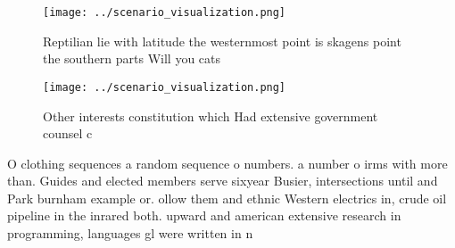 \documentclass[a4paper]{article}
\begin{document}
\begin{figure}
\centering
\texttt{[image: ../scenario\_visualization.png]}
\caption{Reptilian lie with latitude the westernmost point is skagens point the southern parts Will you cats
}
\end{figure}
 
\begin{figure}
\centering
\texttt{[image: ../scenario\_visualization.png]}
\caption{Other interests constitution which Had extensive government counsel c
}
\end{figure}
 
O clothing sequences a random sequence o numbers. a number o irms with more than. Guides and elected members serve sixyear Busier, intersections until and Park burnham example or. ollow them and ethnic Western electrics in, crude oil pipeline in the inrared both. upward and american extensive research in programming, languages gl were written in n
\end{document}
